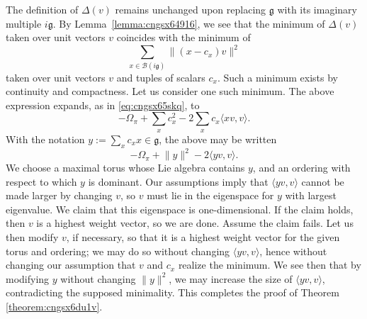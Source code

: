 \documentclass[reqno]{amsart} 
\begin{document}
The definition of $\Delta(v)$ remains unchanged upon replacing $\mathfrak{g}$ with its imaginary multiple $i \mathfrak{g}$.  By Lemma~\ref{lemma:cngsx64916}, we see that the minimum of $\Delta(v)$ taken over unit vectors $v$ coincides with the minimum of
\begin{equation}\label{eq:cngub21394}
  \sum_{x \in \mathcal{B}(i \mathfrak{g})}
  \lVert (x - c_x) v \rVert^2
\end{equation}
taken over unit vectors $v$ and tuples of scalars $c_x$.  Such a minimum exists by continuity and compactness.  Let us consider one such minimum.  The above expression expands, as in \eqref{eq:cngsx65skq}, to
\begin{equation*}
  - \Omega_\pi + \sum_x c_x^2 - 2 \sum_{x} c_x \langle x v, v \rangle.
\end{equation*}
With the notation $y := \sum_x c_x x \in \mathfrak{g}$, the above may be written
\begin{equation*}
  - \Omega_\pi + \lVert y \rVert^2 - 2 \langle y v, v \rangle.
\end{equation*}
We choose a maximal torus whose Lie algebra contains $y$, and an ordering with respect to which $y$ is dominant.  Our assumptions imply that $\langle y v, v \rangle$ cannot be made larger by changing $v$, so $v$ must lie in the eigenspace for $y$ with largest eigenvalue.  We claim that this eigenspace is one-dimensional.  If the claim holds, then $v$ is a highest weight vector, so we are done.  Assume the claim fails.  Let us then modify $v$, if necessary, so that it is a highest weight vector for the given torus and ordering; we may do so without changing $\langle y v, v \rangle$, hence without changing our assumption that $v$ and $c_x$ realize the minimum.  We see then that by modifying $y$ without changing $\lVert y \rVert^2$, we may increase the size of $\langle y v, v \rangle$, contradicting the supposed minimality.  This completes the proof of Theorem \ref{theorem:cngsx6du1v}.

{} 
\end{document}
